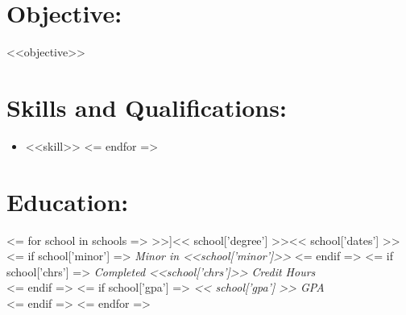 \documentclass{resume}
\author{ <<author>> }
\begin{document}
\maketitle

\section{Objective:}

\small <<objective>> \normalsize

\section{Skills and Qualifications:}
\small\begin{itemize}
<= for skill in skills =>
    \item <<skill>>
<= endfor =>
\end{itemize}\normalsize

\section{Education:}

<= for school in schools =>
    \affiliation[<< school['place'] >>]{<< school['degree'] >>}{<< school['dates'] >>}
    <= if school['minor'] =>
        \textit{Minor in <<school['minor']>>}
    <= endif =>
    <= if school['chrs'] =>
        \emph{Completed <<school['chrs']>> Credit Hours}\\
    <= endif =>
    <= if school['gpa'] =>
        \emph{ << school['gpa'] >> GPA}\\
    <= endif =>
<= endfor =>
\end{document}
